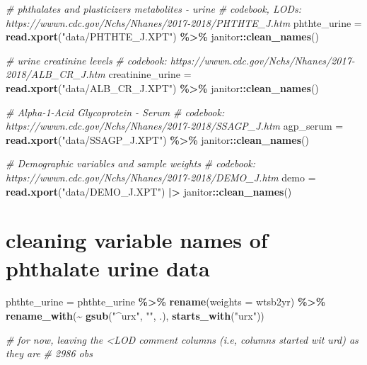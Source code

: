\documentclass[
]{article}
\newenvironment{Shaded}{\begin{snugshade}}{\end{snugshade}}
\newcommand{\AttributeTok}[1]{\textcolor[rgb]{0.13,0.29,0.53}{#1}}
\newcommand{\CommentTok}[1]{\textcolor[rgb]{0.56,0.35,0.01}{\textit{#1}}}
\newcommand{\FunctionTok}[1]{\textcolor[rgb]{0.13,0.29,0.53}{\textbf{#1}}}
\newcommand{\NormalTok}[1]{#1}
\newcommand{\OtherTok}[1]{\textcolor[rgb]{0.56,0.35,0.01}{#1}}
\newcommand{\SpecialCharTok}[1]{\textcolor[rgb]{0.81,0.36,0.00}{\textbf{#1}}}
\newcommand{\StringTok}[1]{\textcolor[rgb]{0.31,0.60,0.02}{#1}}
\begin{document}
\begin{Shaded}
\begin{Highlighting}[]
\CommentTok{\# phthalates and plasticizers metabolites {-} urine }
\CommentTok{\# codebook, LODs: https://wwwn.cdc.gov/Nchs/Nhanes/2017{-}2018/PHTHTE\_J.htm}
\NormalTok{phthte\_urine }\OtherTok{=}
  \FunctionTok{read.xport}\NormalTok{(}\StringTok{"data/PHTHTE\_J.XPT"}\NormalTok{) }\SpecialCharTok{\%\textgreater{}\%} 
\NormalTok{  janitor}\SpecialCharTok{::}\FunctionTok{clean\_names}\NormalTok{()}

\CommentTok{\# urine creatinine levels }
\CommentTok{\# codebook: https://wwwn.cdc.gov/Nchs/Nhanes/2017{-}2018/ALB\_CR\_J.htm}
\NormalTok{creatinine\_urine }\OtherTok{=}
  \FunctionTok{read.xport}\NormalTok{(}\StringTok{"data/ALB\_CR\_J.XPT"}\NormalTok{) }\SpecialCharTok{\%\textgreater{}\%} 
\NormalTok{  janitor}\SpecialCharTok{::}\FunctionTok{clean\_names}\NormalTok{()}

\CommentTok{\# Alpha{-}1{-}Acid Glycoprotein {-} Serum}
\CommentTok{\# codebook: https://wwwn.cdc.gov/Nchs/Nhanes/2017{-}2018/SSAGP\_J.htm}
\NormalTok{agp\_serum }\OtherTok{=}
  \FunctionTok{read.xport}\NormalTok{(}\StringTok{"data/SSAGP\_J.XPT"}\NormalTok{) }\SpecialCharTok{\%\textgreater{}\%} 
\NormalTok{  janitor}\SpecialCharTok{::}\FunctionTok{clean\_names}\NormalTok{()}

\CommentTok{\# Demographic variables and sample weights }
\CommentTok{\# codebook: https://wwwn.cdc.gov/Nchs/Nhanes/2017{-}2018/DEMO\_J.htm}
\NormalTok{demo }\OtherTok{=}
  \FunctionTok{read.xport}\NormalTok{(}\StringTok{"data/DEMO\_J.XPT"}\NormalTok{) }\SpecialCharTok{|\textgreater{}} 
\NormalTok{  janitor}\SpecialCharTok{::}\FunctionTok{clean\_names}\NormalTok{()}
\end{Highlighting}
\end{Shaded}

\hypertarget{cleaning-variable-names-of-phthalate-urine-data}{%
\section{cleaning variable names of phthalate urine
data}\label{cleaning-variable-names-of-phthalate-urine-data}}

\begin{Shaded}
\begin{Highlighting}[]
\NormalTok{phthte\_urine }\OtherTok{=}
\NormalTok{  phthte\_urine }\SpecialCharTok{\%\textgreater{}\%} 
  \FunctionTok{rename}\NormalTok{(}\AttributeTok{weights =}\NormalTok{ wtsb2yr) }\SpecialCharTok{\%\textgreater{}\%}
  \FunctionTok{rename\_with}\NormalTok{(}\SpecialCharTok{\textasciitilde{}} \FunctionTok{gsub}\NormalTok{(}\StringTok{"\^{}urx"}\NormalTok{, }\StringTok{""}\NormalTok{, .), }\FunctionTok{starts\_with}\NormalTok{(}\StringTok{"urx"}\NormalTok{))}
  
\CommentTok{\# for now, leaving the \textless{}LOD comment columns (i.e, columns started wit urd) as they are }
\CommentTok{\# 2986 obs}
\end{Highlighting}
\end{Shaded}
\end{document}
